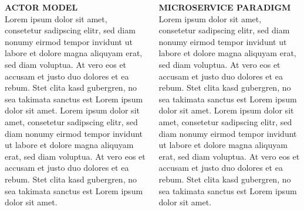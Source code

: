 \documentclass[final,hyperref={pdfpagelabels=true}]{beamer}
\begin{document}
\begin{frame}
    \vspace*{2\baselineskip}

    \begin{columns}[t]
    \begin{column}{.45\textwidth}
      \textsf{\textbf{ACTOR MODEL}} \\
      \vspace*{\baselineskip}
      {\lmodern
        Lorem ipsum dolor sit amet, consetetur sadipscing elitr, sed diam nonumy eirmod tempor invidunt ut labore et dolore magna aliquyam erat, sed diam voluptua. At vero eos et accusam et justo duo dolores et ea rebum. Stet clita kasd gubergren, no sea takimata sanctus est Lorem ipsum dolor sit amet. Lorem ipsum dolor sit amet, consetetur sadipscing elitr, sed diam nonumy eirmod tempor invidunt ut labore et dolore magna aliquyam erat, sed diam voluptua. At vero eos et accusam et justo duo dolores et ea rebum. Stet clita kasd gubergren, no sea takimata sanctus est Lorem ipsum dolor sit amet.
      }
    \end{column}

    \begin{column}{.45\textwidth}
      \textsf{\textbf{MICROSERVICE PARADIGM}} \\
      \vspace*{\baselineskip}
      {\lmodern
        Lorem ipsum dolor sit amet, consetetur sadipscing elitr, sed diam nonumy eirmod tempor invidunt ut labore et dolore magna aliquyam erat, sed diam voluptua. At vero eos et accusam et justo duo dolores et ea rebum. Stet clita kasd gubergren, no sea takimata sanctus est Lorem ipsum dolor sit amet. Lorem ipsum dolor sit amet, consetetur sadipscing elitr, sed diam nonumy eirmod tempor invidunt ut labore et dolore magna aliquyam erat, sed diam voluptua. At vero eos et accusam et justo duo dolores et ea rebum. Stet clita kasd gubergren, no sea takimata sanctus est Lorem ipsum dolor sit amet.
      }
    \end{column}
  \end{columns}

  \vspace*{2\baselineskip}


\end{frame}
\end{document}

